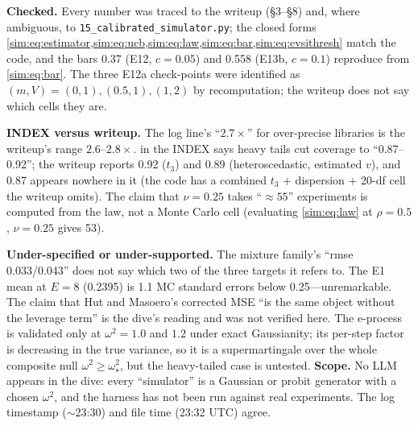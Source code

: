 \begin{reviewernote}[(compiler)]
\textbf{Checked.} Every number was traced to the writeup (\S3--\S8) and, where ambiguous, to \texttt{15\_calibrated\_simulator.py}; the closed forms \cref{sim:eq:estimator,sim:eq:ucb,sim:eq:law,sim:eq:bar,sim:eq:evsithresh} match the code, and the bars 0.37 (E12, $c = 0.05$) and 0.558 (E13b, $c = 0.1$) reproduce from \cref{sim:eq:bar}. The three E12a check-points were identified as $(m, V) = (0, 1), (0.5, 1), (1, 2)$ by recomputation; the writeup does not say which cells they are.

\textbf{INDEX versus writeup.} The log line's ``$2.7\times$'' for over-precise libraries is the writeup's range $2.6$--$2.8\times$.  in the INDEX says heavy tails cut coverage to ``0.87--0.92''; the writeup reports 0.92 ($t_3$) and 0.89 (heteroscedastic, estimated $v$), and 0.87 appears nowhere in it (the code has a combined $t_3$ + dispersion + 20-df cell the writeup omits). The claim that $\nu = 0.25$ takes ``$\approx 55$'' experiments is computed from the law, not a Monte Carlo cell (evaluating \cref{sim:eq:law} at $\rho = 0.5$, $\nu = 0.25$ gives 53).

\textbf{Under-specified or under-supported.} The mixture family's ``rmse 0.033/0.043'' does not say which two of the three targets it refers to. The E1 mean at $E = 8$ (0.2395) is 1.1 MC standard errors below 0.25---unremarkable. The claim that Hut and Masoero's corrected MSE ``is the same object without the leverage term'' is the dive's reading and was not verified here. The e-process is validated only at $\omega^2 = 1.0$ and $1.2$ under exact Gaussianity; its per-step factor is decreasing in the true variance, so it is a supermartingale over the whole composite null $\omega^2 \ge \omega_\star^2$, but the heavy-tailed case is untested. \textbf{Scope.} No LLM appears in the dive: every ``simulator'' is a Gaussian or probit generator with a chosen $\omega^2$, and the harness has not been run against real experiments. The log timestamp ($\sim$23:30) and file time (23:32 UTC) agree.
\end{reviewernote}

